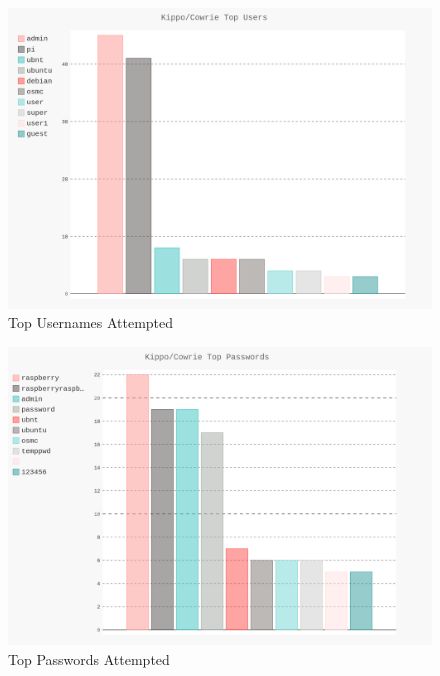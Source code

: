 \documentclass[a0,landscape]{a0poster}
\begin{document}
\begin{multicols}{3}
\begin{figure}[H]
	\begin{center}
		\includegraphics[width=20cm]{images/top_users.png}
		\caption{Top Usernames Attempted}
	\end{center}
\end{figure}

\begin{figure}[H]
	\begin{center}
		\includegraphics[width=20cm]{images/top_pass.png}
		\caption{Top Passwords Attempted}
	\end{center}
\end{figure}





\end{multicols}
\end{document}
